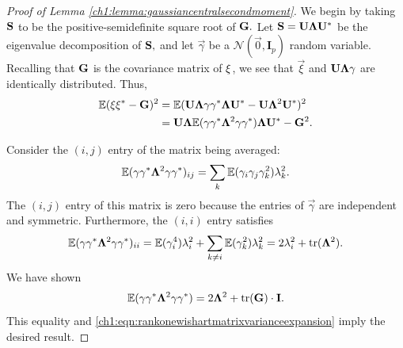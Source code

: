\begin{proof}[Proof of Lemma \ref{ch1:lemma:gaussiancentralsecondmoment}]
We begin by taking $\mathbf{S}$ to be the positive-semidefinite square root of
$\mathbf{G}.$ Let $\mathbf{S} = \mathbf{U} \mathbf{\Lambda} \mathbf{U}^*$ be the eigenvalue
decomposition of $\mathbf{S},$ and let $\vec{\gamma}$ be a $\mathcal{N}(\vec{0},
\mathbf{I}_p)$ random variable. Recalling that $\mathbf{G}$ is the covariance
matrix of $\mathbf{\xi}$, we see that $\vec{\xi}$ and $\mathbf{U} \mathbf{\Lambda}
\mathbf{\gamma}$ are identically distributed. Thus,
\begin{align}
\mathbb{E}(\mathbf{\xi}\mathbf{\xi}^* - \mathbf{G})^2 
& = \mathbb{E}(\mathbf{U} \mathbf{\Lambda} \mathbf{\gamma}\mathbf{\gamma}^* \mathbf{\Lambda}
\mathbf{U}^* - \mathbf{U} \mathbf{\Lambda}^2 \mathbf{U}^*)^2 \notag \\
& = \mathbf{U} \mathbf{\Lambda} \mathbb{E}(\mathbf{\gamma}\mathbf{\gamma}^* \mathbf{\Lambda}^2
\mathbf{\gamma}\mathbf{\gamma}^*) \mathbf{\Lambda} \mathbf{U}^* - \mathbf{G}^2. 
\label{ch1:eqn:rankonewishartmatrixvarianceexpansion}
\end{align}

Consider the $(i,j)$ entry of the matrix being averaged:
\[
\mathbb{E}(\mathbf{\gamma}\mathbf{\gamma}^* \mathbf{\Lambda}^2
\mathbf{\gamma}\mathbf{\gamma}^*)_{ij} =  \sum_k \mathbb{E}(\gamma_i \gamma_j \gamma_k^2)
\lambda_k^2.
\]
The $(i,j)$ entry of this matrix is zero because the entries of $\vec{\gamma}$
are independent and symmetric. Furthermore, the $(i,i)$ entry satisfies
\[
\mathbb{E}(\mathbf{\gamma}\mathbf{\gamma}^* \mathbf{\Lambda}^2
\mathbf{\gamma}\mathbf{\gamma}^*)_{ii} = \mathbb{E}(\gamma_i^4) \lambda_i^2 + \sum_{k \neq
i} \mathbb{E}(\gamma_k^2) \lambda_k^2 = 2 \lambda_i^2 + \operatorname{tr}(\mathbf{\Lambda}^2).
\]
We have shown
\[
\mathbb{E}(\mathbf{\gamma} \mathbf{\gamma}^* \mathbf{\Lambda}^2
\mathbf{\gamma}\mathbf{\gamma}^*) = 2 \mathbf{\Lambda}^2 + \operatorname{tr}(\mathbf{G}) \cdot
\mathbf{I}.
\]
This equality and \eqref{ch1:eqn:rankonewishartmatrixvarianceexpansion} imply the
desired result.
\end{proof}

